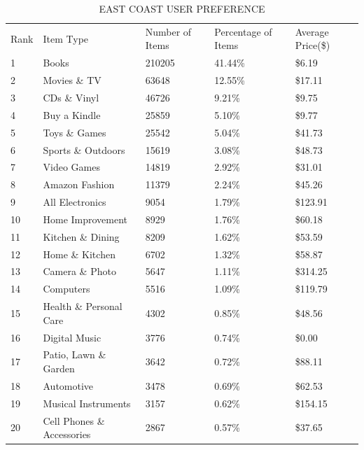 \documentclass{llncs}
\begin{document}
\begin{table}[!htbp]
\caption{EAST COAST USER PREFERENCE}
\label{tb:east}
\begin{tabular}{lllll}
Rank & Item Type          & Number of Items & Percentage of Items & Average Price(\$) \\
1 & Books & 210205 & 41.44\% & \$6.19 \\
2 & Movies \& TV & 63648 & 12.55\% & \$17.11 \\
3 & CDs \& Vinyl & 46726 & 9.21\% & \$9.75 \\
4 & Buy a Kindle & 25859 & 5.10\% & \$9.77 \\
5 & Toys \& Games & 25542 & 5.04\% & \$41.73 \\
6 & Sports \& Outdoors & 15619 & 3.08\% & \$48.73 \\
7 & Video Games & 14819 & 2.92\% & \$31.01 \\
8 & Amazon Fashion & 11379 & 2.24\% & \$45.26 \\
9 & All Electronics & 9054 & 1.79\% & \$123.91 \\
10 & Home Improvement & 8929 & 1.76\% & \$60.18 \\
11 & Kitchen \& Dining & 8209 & 1.62\% & \$53.59 \\
12 & Home \& Kitchen & 6702 & 1.32\% & \$58.87 \\
13 & Camera \& Photo & 5647 & 1.11\% & \$314.25 \\
14 & Computers & 5516 & 1.09\% & \$119.79 \\
15 & Health \& Personal Care & 4302 & 0.85\% & \$48.56 \\
16 & Digital Music & 3776 & 0.74\% & \$0.00 \\
17 & Patio, Lawn \& Garden & 3642 & 0.72\% & \$88.11 \\
18 & Automotive & 3478 & 0.69\% & \$62.53 \\
19 & Musical Instruments & 3157 & 0.62\% & \$154.15 \\
20 & Cell Phones \& Accessories & 2867 & 0.57\% & \$37.65 \\
\end{tabular}
\end{table}
\end{document}
